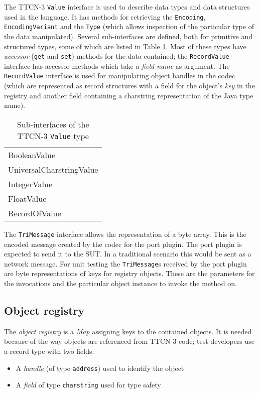 The \ac{TTCN-3} \verb=Value= interface is used to describe
data types and data structures used in the language.
It has methods for retrieving the
\verb=Encoding=, \verb=EncodingVariant= and the \verb=Type=
(which allows inspection of the particular type of the data manipulated).
Several sub-interfaces are defined, both for primitive and structured types,
some of which are listed in Table \ref{tab:value-subinterfaces}.
Most of these types have \emph{accessor} (\verb=get= and \verb=set=) methods
for the data contained;
the \verb=RecordValue= interface has accessor methods which take
a \emph{field name} as argument.
The \verb=RecordValue= interface is used
for manipulating object handles in the codec
(which are represented as record structures
with a field for the object's \emph{key} in the registry
and another field containing a charstring representation
of the Java type name).

\begin{table}
\centering
\begin{tabular}{|l|}
\hline
BooleanValue \\
UniversalCharstringValue \\
IntegerValue \\
FloatValue \\
RecordOfValue \\
\hline
\end{tabular}
\caption{Sub-interfaces of the TTCN-3 \texttt{Value} type%
	\label{tab:value-subinterfaces}}
\end{table}

The \verb=TriMessage= interface allows the representation of a byte array.
This is the encoded message created by the codec for the port plugin.
The port plugin is expected to send it to the \ac{SUT}.
In a traditional scenario this would be sent as a network message.
For unit testing the \verb=TriMessage=s received by the port plugin
are byte representations of keys for registry objects.
These are the parameters for the invocations
and the particular object instance to invoke the method on.


\subsection{Object registry}

The \emph{object registry} is a \emph{Map}
assigning keys to the contained objects.
It is needed because of the way objects are referenced from \ac{TTCN-3} code;
test developers use a record type with two fields:
\begin{itemize}
\item A \emph{handle} (of type \verb=address=) used to identify the object
\item A \emph{field} of type \verb=charstring= used for type safety
\end{itemize}

